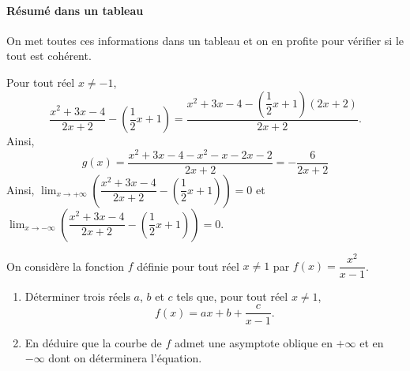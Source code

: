 \documentclass[11pt,fleqn, openany]{book} %
\begin{document}
\begin{solution}
\paragraph{Résumé dans un tableau}

On met toutes ces informations dans un tableau et on en profite pour vérifier si le tout est cohérent.

\begin{center}
\end{center}

Pour tout réel $x\neq -1$, 
\[ \dfrac{x^2+3x-4}{2x+2} - \left(\dfrac{1}{2}x+1\right)=\dfrac{x^2+3x-4-\left(\dfrac{1}{2}x+1\right)(2x+2)}{2x+2}.\]
Ainsi,
\[g(x)=\dfrac{x^2+3x-4-x^2-x-2x-2}{2x+2}=-\dfrac{6}{2x+2}\]
Ainsi, $\displaystyle\lim_{x \to +\infty} \left(\dfrac{x^2+3x-4}{2x+2} - \left(\dfrac{1}{2}x+1\right)\right)=0$ et $\displaystyle\lim_{x \to -\infty} \left(\dfrac{x^2+3x-4}{2x+2} - \left(\dfrac{1}{2}x+1\right)\right)=0$.

\begin{center}
\end{center}

\end{solution}




\begin{exercise}On considère la fonction $f$ définie pour tout réel $x \neq 1$ par $f(x)=\dfrac{x^2}{x-1}$.
\begin{enumerate}
\item Déterminer trois réels $a$, $b$ et $c$ tels que, pour tout réel $x\neq 1$, 
\[f(x)=ax+b+\dfrac{c}{x-1}.\]
\item En déduire que la courbe de $f$ admet une asymptote oblique en $+\infty$ et en $-\infty$ dont on déterminera l'équation.
\end{enumerate}\end{exercise}
\end{document}
